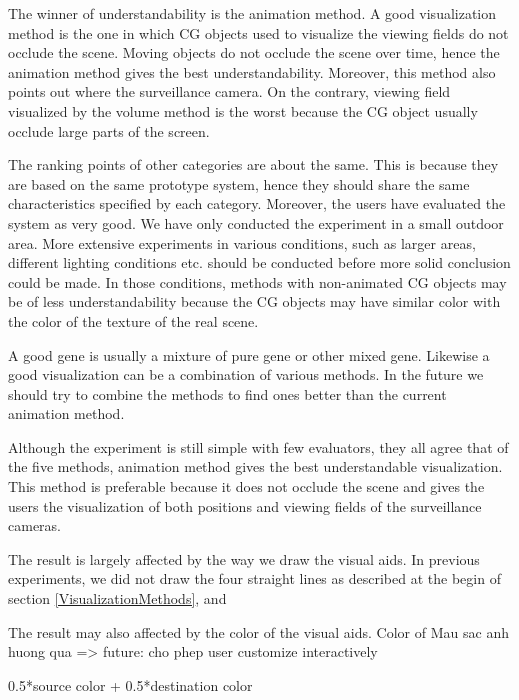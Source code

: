 The winner of understandability is the animation method. A good visualization method is the one in which CG objects used to visualize the viewing fields do not occlude the scene. Moving objects do not occlude the scene over time, hence the animation method gives the best understandability. Moreover, this method also points out where the surveillance camera. On the contrary, viewing field visualized by the volume method is the worst because the CG object usually occlude large parts of the screen.

The ranking points of other categories are about the same. This is because they are based on the same prototype system, hence they should share the same characteristics specified by each category. Moreover, the users have evaluated the system as very good. We have only conducted the experiment in a small outdoor area. More extensive experiments in various conditions, such as larger areas, different lighting conditions etc. should be conducted before more solid conclusion could be made. In those conditions, methods with non-animated CG objects may be of less understandability because the CG objects may have similar color with the color of the texture of the real scene.

A good gene is usually a mixture of pure gene or other mixed gene. Likewise a good visualization can be a combination of various methods. In the future we should try to combine the methods to find ones better than the current animation method.

Although the experiment is still simple with few evaluators, they all agree that of the five methods, animation method gives the best understandable visualization. This method is preferable because it does not occlude the scene and gives the users the visualization of both positions and viewing fields of the surveillance cameras.

The result is largely affected by the way we draw the visual aids. In previous experiments, we did not draw the four straight lines as described at the begin of section \ref{VisualizationMethods}, and 

The result may also affected by the color of the visual aids.
Color of
Mau sac anh huong qua
=> future: cho phep user customize interactively

0.5*source color + 0.5*destination color
	
